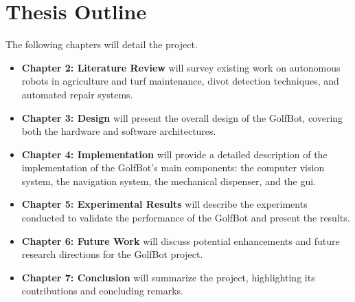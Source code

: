 \section{Thesis Outline}
The following chapters will detail the project.
\begin{itemize}
    \item \textbf{Chapter 2: Literature Review} will survey existing work on autonomous robots in agriculture and turf maintenance, divot detection techniques, and automated repair systems.
    \item \textbf{Chapter 3: Design} will present the overall design of the GolfBot, covering both the hardware and software architectures.
    \item \textbf{Chapter 4: Implementation} will provide a detailed description of the implementation of the GolfBot's main components: the computer vision system, the navigation system, the mechanical dispenser, and the \gls{gui}.
    \item \textbf{Chapter 5: Experimental Results} will describe the experiments conducted to validate the performance of the GolfBot and present the results.
    \item \textbf{Chapter 6: Future Work} will discuss potential enhancements and future research directions for the GolfBot project.
    \item \textbf{Chapter 7: Conclusion} will summarize the project, highlighting its contributions and concluding remarks.
\end{itemize}